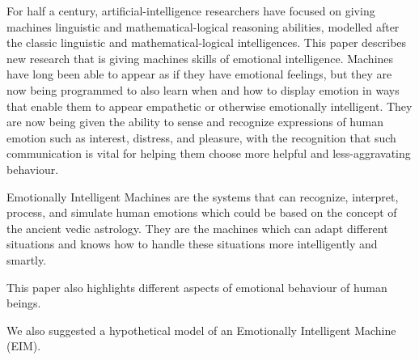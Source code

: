 For half a century, artificial-intelligence researchers have focused on giving machines linguistic and mathematical-logical reasoning abilities, modelled after the classic linguistic and mathematical-logical intelligences. This paper describes new research that is giving machines skills of emotional intelligence. Machines have long been able to appear as if they have emotional feelings, but they are now being programmed to also learn when and how to display emotion in ways that enable them to appear empathetic or otherwise emotionally intelligent. They are now being given the ability to sense and recognize expressions of human emotion such as interest, distress, and pleasure, with the recognition that such communication is vital for helping them choose more helpful and less-aggravating behaviour.

Emotionally Intelligent Machines are the systems that can recognize, interpret, process, and simulate human emotions which could be based on the concept of the ancient vedic astrology. They are the machines which can adapt different situations and knows how to handle these situations more intelligently and smartly.

This paper also highlights different aspects of emotional behaviour of human beings.

We also suggested a hypothetical model of an Emotionally Intelligent Machine (EIM).